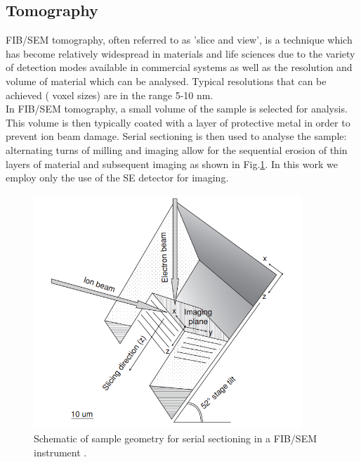 \subsection{Tomography}
FIB/SEM tomography, often referred to as 'slice and view', is a technique which has become relatively widespread in materials and life sciences due to the variety of detection modes available in commercial systems as well as the resolution and volume of material which can be analysed. Typical resolutions that can be achieved ( voxel sizes) are in the range 5-10 nm.\\
In FIB/SEM tomography, a small volume of the sample is selected for analysis. This volume is then typically coated with a layer of protective metal in order to prevent ion beam damage. Serial sectioning is then used to analyse the sample: alternating turns of milling and imaging allow for the sequential erosion of thin layers of material and subsequent imaging as shown in Fig.\ref{2.10}. In this work we employ only the use of the SE detector for imaging.

\begin{figure}[!ht]
	\centering
	\includegraphics[width=0.9\textwidth]{Figs/Ch2/SnV.png}
	\caption[h] {Schematic of sample geometry for serial sectioning in a FIB/SEM instrument \cite{Holzer2004}.}
	\label{2.10}
\end{figure}
\FloatBarrier


